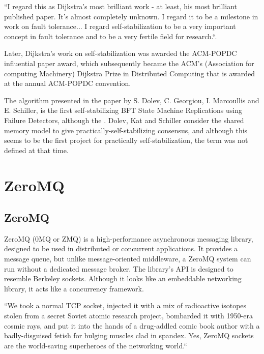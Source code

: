 \documentclass[12pt,a4paper]{report}
\begin{document}
			 ``I regard this as Dijkstra's most brilliant work - at least, his most brilliant published paper. It's almost completely unknown. I regard it to 
			 be a milestone in work on fault tolerance... I regard self-stabilization to be a very important concept in fault tolerance and to be a very 
			 fertile field for research.``.


			Later, Dijkstra's work on self-stabilization was awarded the ACM-POPDC influential paper award, which subsequently became the 
			ACM's (Association for computing Machinery) Dijkstra Prize in Distributed Computing that is awarded at the annual ACM-POPDC convention.
			

			The algorithm presented in the paper by S. Dolev, C. Georgiou, I. Marcoullis and E. Schiller, is the first self-stabilizing BFT State Machine Replications using  Failure Detectors, although the . Dolev, Kat and Schiller  consider  the  shared  memory  model  to  give  practically-self-stabilizing consensus, and although this seems to be the first project for practically self-stabilization, the term was not defined at that time.
		\section{ZeroMQ}
		\subsection{ZeroMQ}
    		ZeroMQ (0MQ or ZMQ) is a high-performance asynchronous messaging library, designed to be used in distributed or concurrent applications. It 
    		provides a message queue, but unlike message-oriented middleware, a ZeroMQ system can run without a dedicated message broker. The library's API is 
    		designed to resemble Berkeley sockets. Although it looks like an embeddable networking library, it acts like a concurrency framework.
		
		
		``We took a normal TCP socket, injected it with a mix of radioactive isotopes stolen from a secret Soviet atomic research project, bombarded it with 1950-era cosmic rays, and put it into the hands of a drug-addled comic book author with a badly-disguised fetish for bulging muscles clad in spandex. Yes, ZeroMQ sockets are the world-saving superheroes of the networking world.``\cite{zguide}
		
		
		
		
\end{document}
